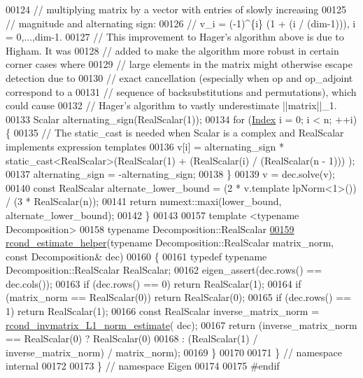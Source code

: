 \begin{DoxyCode}
00124   \textcolor{comment}{// multiplying matrix by a vector with entries of slowly increasing}
00125   \textcolor{comment}{// magnitude and alternating sign:}
00126   \textcolor{comment}{//   v\_i = (-1)^\{i\} (1 + (i / (dim-1))), i = 0,...,dim-1.}
00127   \textcolor{comment}{// This improvement to Hager's algorithm above is due to Higham. It was}
00128   \textcolor{comment}{// added to make the algorithm more robust in certain corner cases where}
00129   \textcolor{comment}{// large elements in the matrix might otherwise escape detection due to}
00130   \textcolor{comment}{// exact cancellation (especially when op and op\_adjoint correspond to a}
00131   \textcolor{comment}{// sequence of backsubstitutions and permutations), which could cause}
00132   \textcolor{comment}{// Hager's algorithm to vastly underestimate ||matrix||\_1.}
00133   Scalar alternating\_sign(RealScalar(1));
00134   \textcolor{keywordflow}{for} (\hyperlink{namespace_eigen_a62e77e0933482dafde8fe197d9a2cfde}{Index} i = 0; i < n; ++i) \{
00135     \textcolor{comment}{// The static\_cast is needed when Scalar is a complex and RealScalar implements expression templates}
00136     v[i] = alternating\_sign * \textcolor{keyword}{static\_cast<}RealScalar\textcolor{keyword}{>}(RealScalar(1) + (RealScalar(i) / (RealScalar(n - 1)))
      );
00137     alternating\_sign = -alternating\_sign;
00138   \}
00139   v = dec.solve(v);
00140   \textcolor{keyword}{const} RealScalar alternate\_lower\_bound = (2 * v.template lpNorm<1>()) / (3 * RealScalar(n));
00141   \textcolor{keywordflow}{return} numext::maxi(lower\_bound, alternate\_lower\_bound);
00142 \}
00143 
00157 \textcolor{keyword}{template} <\textcolor{keyword}{typename} Decomposition>
00158 \textcolor{keyword}{typename} Decomposition::RealScalar
\hyperlink{namespace_eigen_1_1internal_ad1de0d785387bfb5435c410bf0554068}{00159} \hyperlink{namespace_eigen_1_1internal_ad1de0d785387bfb5435c410bf0554068}{rcond\_estimate\_helper}(\textcolor{keyword}{typename} Decomposition::RealScalar matrix\_norm, \textcolor{keyword}{const} 
      Decomposition& dec)
00160 \{
00161   \textcolor{keyword}{typedef} \textcolor{keyword}{typename} Decomposition::RealScalar RealScalar;
00162   eigen\_assert(dec.rows() == dec.cols());
00163   \textcolor{keywordflow}{if} (dec.rows() == 0)              \textcolor{keywordflow}{return} RealScalar(1);
00164   \textcolor{keywordflow}{if} (matrix\_norm == RealScalar(0)) \textcolor{keywordflow}{return} RealScalar(0);
00165   \textcolor{keywordflow}{if} (dec.rows() == 1)              \textcolor{keywordflow}{return} RealScalar(1);
00166   \textcolor{keyword}{const} RealScalar inverse\_matrix\_norm = \hyperlink{namespace_eigen_1_1internal_aa3f5b3cfa34df750994a247d4823aa51}{rcond\_invmatrix\_L1\_norm\_estimate}(
      dec);
00167   \textcolor{keywordflow}{return} (inverse\_matrix\_norm == RealScalar(0) ? RealScalar(0)
00168                                                : (RealScalar(1) / inverse\_matrix\_norm) / matrix\_norm);
00169 \}
00170 
00171 \}  \textcolor{comment}{// namespace internal}
00172 
00173 \}  \textcolor{comment}{// namespace Eigen}
00174 
00175 \textcolor{preprocessor}{#endif}
\end{DoxyCode}
